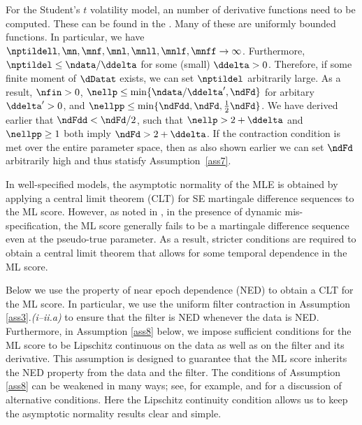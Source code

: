 \begin{exmc} %
For the Student's $t$ volatility model, an number of derivative functions need to be computed. These can be found in the \SupplementaryAppendix. Many of these are uniformly bounded functions. In particular, we have 
$\nptildell, \mn, \mnf, \mnl, \mnll, \mnlf, \mnff \to \infty$.
Furthermore, $\nptildel \leq \ndata/\ddelta$ for some (small) $\ddelta>0$. 
Therefore, if some finite moment of $\dDatat$ exists, we can set $\nptildel$ arbitrarily large.
As a result, $\nfin > 0$, $\nellp \leq \min\{\ndata/\ddelta', \ndFd\}$ for arbitary $\ddelta'>0$, and $\nellpp \leq \min\{\ndFdd, \ndFd, \tfrac12\ndFd\}$. We have derived earlier that $\ndFdd < \ndFd/2$, such that $\nellp>2+\ddelta$ and $\nellpp \geq 1$ both imply $\ndFd > 2+\ddelta$. If the contraction condition is met over the entire parameter space, then as also shown earlier we can set $\ndFd$ arbitrarily high and thus statisfy Assumption~\ref{ass7}.
\end{exmc}



In well-specified models, the asymptotic normality of the MLE is obtained by applying a central limit theorem (CLT) for SE martingale difference sequences to the ML score. However, as noted in \citet{RePEc:cup:cbooks:9780521252805}, in the presence of dynamic mis-specification, the ML score generally fails to be a martingale difference sequence even at the pseudo-true parameter. As a result, stricter conditions are required to obtain a central limit theorem that allows for some temporal dependence in the ML score. 

Below we use the property of near epoch dependence (NED) to obtain a CLT for the ML score. In particular, we use the uniform filter contraction in Assumption \ref{ass3}.\textit{(i--ii.a)} to ensure that the filter is NED whenever the data is NED. Furthermore, in Assumption \ref{ass8} below, we impose sufficient conditions for the ML score to be Lipschitz continuous on the data as well as on the filter and its derivative. This assumption is designed to guarantee that the ML score inherits the NED property from the data and the filter. The conditions of Assumption \ref{ass8}  can be weakened in many ways; see, for example, \citet{davidson1994} and \citet{potscherprucha1997} for a discussion of alternative conditions. Here the Lipschitz continuity condition allows us to keep the asymptotic normality results clear and simple.

